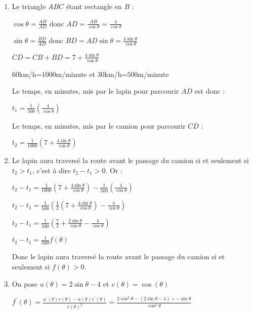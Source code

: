 \begin{corrige}
     \begin{enumerate}
          \item
          Le triangle $ABC$ étant rectangle en $B$ :
          \par
          $\cos \theta =\frac{AB}{AD}$ donc $AD=\frac{AB}{\cos \theta }=\frac{4}{\cos \theta }$
          \par
          $\sin \theta =\frac{BD}{AD}$ donc $BD=AD \sin \theta = \frac{4 \sin \theta }{\cos \theta }$
          \par
          $CD=CB+BD=7+\frac{4 \sin \theta }{\cos \theta }$
          \par
          $60$km/h=$1 000$m/minute et $30$km/h=$500$m/minute
          \par
          Le temps, en minutes, mis par le lapin pour parcourir $AD$ est donc :
          \par
          $t_{1}=\frac{1}{500}\left(\frac{4}{\cos \theta }\right)$
          \par
          Le temps, en minutes, mis par le camion pour parcourir $CD$ :
          \par
          $t_{2}= \frac{1}{1000}\left(7+\frac{4 \sin \theta }{\cos \theta }\right)$
          \item
          Le lapin aura traversé la route avant le passage du camion si et seulement si $t_{2} > t_{1}$, c'est à dire $t_{2}-t_{1} > 0$. Or :
          \par
          $t_{2}-t_{1}=\frac{1}{1000}\left(7+\frac{4 \sin \theta }{\cos \theta }\right)-\frac{1}{500}\left(\frac{4}{\cos \theta }\right)$
          \par
          $t_{2}-t_{1}=\frac{1}{500}\left(\frac{1}{2}\left(7+\frac{4 \sin \theta }{\cos \theta }\right)-\frac{4}{\cos \theta }\right)$
          \par
          $t_{2}-t_{1}=\frac{1}{500}\left(\frac{7}{2}+\frac{2 \sin \theta }{\cos \theta }-\frac{4}{\cos \theta }\right)$
          \par
          $t_{2}-t_{1}=\frac{1}{500}f\left(\theta \right)$
          \par
          Donc le lapin aura traversé la route avant le passage du camion si et seulement si $f\left(\theta \right) > 0$.
          \item
          On pose $u\left(\theta \right)=2\sin \theta -4$ et $v\left(\theta \right)=\cos\left(\theta \right)$
          \par
          $f^{\prime}\left(\theta \right)=\frac{u^{\prime}\left(\theta \right)v\left(\theta \right)-u\left(\theta \right)v^{\prime}\left(\theta \right)}{v\left(\theta \right)^{2}}=\frac{2\cos^{2}\theta -\left(2\sin \theta -4\right)\times -\sin \theta }{\cos^{2}\theta }$

\end{enumerate}
\end{corrige}
